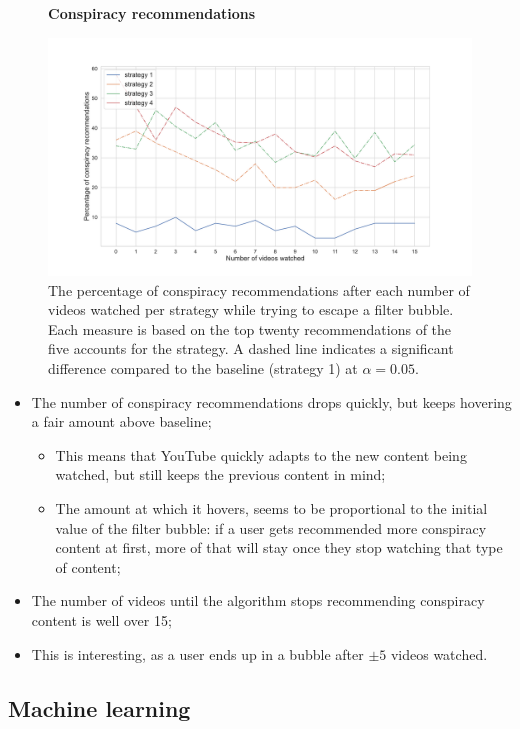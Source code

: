 \documentclass[../main.tex]{subfiles}
\begin{document}
\begin{figure}[t]
  \textbf{Conspiracy recommendations}\par\medskip
  \centering
  \includegraphics[keepaspectratio, width=\textwidth]{images/conspiracy_recs_2.pdf}
  \caption{The percentage of conspiracy recommendations after each number of videos watched per strategy while trying to escape a filter bubble. Each measure is based on the top twenty recommendations of the five accounts for the strategy. A dashed line indicates a significant difference compared to the baseline (strategy 1) at $\alpha = 0.05$.}
  \label{fig:con_recs_2}
\end{figure}

\begin{itemize}
    \item The number of conspiracy recommendations drops quickly, but keeps hovering a fair amount above baseline;
    \begin{itemize}
        \item This means that YouTube quickly adapts to the new content being watched, but still keeps the previous content in mind;
        \item The amount at which it hovers, seems to be proportional to the initial value of the filter bubble: if a user gets recommended more conspiracy content at first, more of that will stay once they stop watching that type of content; 
    \end{itemize}
    \item The number of videos until the algorithm stops recommending conspiracy content is well over 15;
    \item This is interesting, as a user ends up in a bubble after $\pm 5$ videos watched.
\end{itemize}

\subsection{Machine learning} \label{ML_results}
\end{document}
